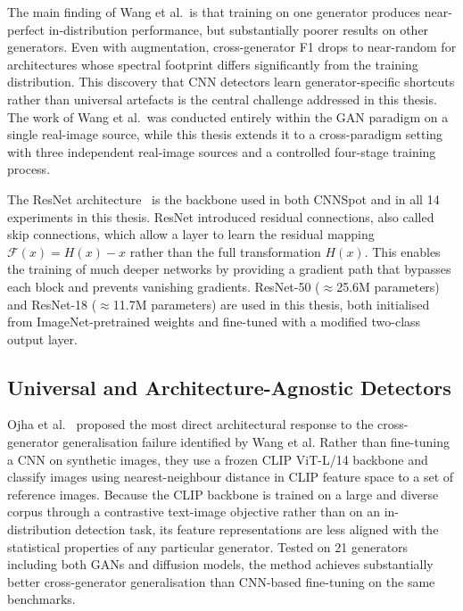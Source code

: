 The main finding of Wang et al.\ is that training on one generator produces near-perfect
in-distribution performance, but substantially poorer results on other generators.
Even with augmentation, cross-generator F1 drops to near-random for architectures whose
spectral footprint differs significantly from the training distribution. This discovery 
that CNN detectors learn generator-specific shortcuts rather than universal artefacts 
is the central challenge addressed in this thesis. The work of Wang et al.\
was conducted entirely within the GAN paradigm on a single real-image source, while this thesis
extends it to a cross-paradigm setting with three independent real-image sources and a
controlled four-stage training process.

The ResNet architecture~\cite{he2016} is the backbone used in both CNNSpot and in all
14 experiments in this thesis. ResNet introduced residual connections, also called skip
connections, which allow a layer to learn the residual mapping $\mathcal{F}(x) = H(x) - x$
rather than the full transformation $H(x)$. This enables the training of much deeper
networks by providing a gradient path that bypasses each block and prevents vanishing
gradients. ResNet-50 (${\approx}$25.6M parameters) and ResNet-18 (${\approx}$11.7M parameters) are used in
this thesis, both initialised from ImageNet-pretrained weights and fine-tuned with a
modified two-class output layer.

\subsection{Universal and Architecture-Agnostic Detectors}
\label{subsec:universal_detectors}

Ojha et al.~\cite{ojha2023} proposed the most direct architectural response to the
cross-generator generalisation failure identified by Wang et al. Rather than fine-tuning
a CNN on synthetic images, they use a frozen CLIP ViT-L/14 backbone and classify images
using nearest-neighbour distance in CLIP feature space to a set of reference images.
Because the CLIP backbone is trained on a large and diverse corpus through a contrastive
text-image objective rather than on an in-distribution detection task, its feature
representations are less aligned with the statistical properties of any particular
generator. Tested on 21 generators including both GANs and diffusion models, the method
achieves substantially better cross-generator generalisation than CNN-based fine-tuning
on the same benchmarks.

